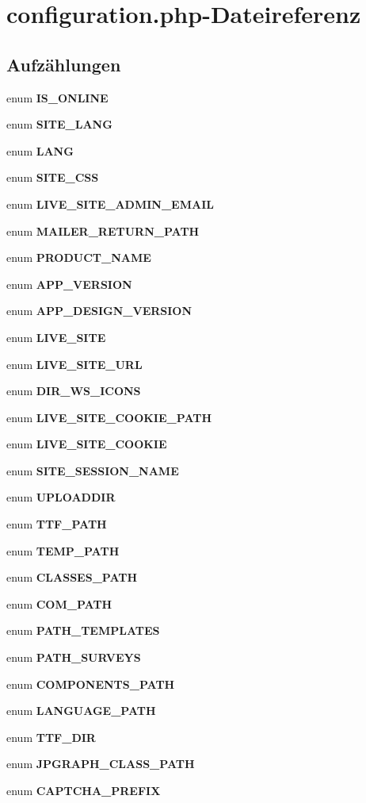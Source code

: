 \section{configuration.php-Dateireferenz}
\label{configuration_8php}
\subsection*{Aufzählungen}
\begin{CompactItemize}
\item 
enum {\bf IS\_\-ONLINE} 
\item 
enum {\bf SITE\_\-LANG} 
\item 
enum {\bf LANG} 
\item 
enum {\bf SITE\_\-CSS} 
\item 
enum {\bf LIVE\_\-SITE\_\-ADMIN\_\-EMAIL} 
\item 
enum {\bf MAILER\_\-RETURN\_\-PATH} 
\item 
enum {\bf PRODUCT\_\-NAME} 
\item 
enum {\bf APP\_\-VERSION} 
\item 
enum {\bf APP\_\-DESIGN\_\-VERSION} 
\item 
enum {\bf LIVE\_\-SITE} 
\item 
enum {\bf LIVE\_\-SITE\_\-URL} 
\item 
enum {\bf DIR\_\-WS\_\-ICONS} 
\item 
enum {\bf LIVE\_\-SITE\_\-COOKIE\_\-PATH} 
\item 
enum {\bf LIVE\_\-SITE\_\-COOKIE} 
\item 
enum {\bf SITE\_\-SESSION\_\-NAME} 
\item 
enum {\bf UPLOADDIR} 
\item 
enum {\bf TTF\_\-PATH} 
\item 
enum {\bf TEMP\_\-PATH} 
\item 
enum {\bf CLASSES\_\-PATH} 
\item 
enum {\bf COM\_\-PATH} 
\item 
enum {\bf PATH\_\-TEMPLATES} 
\item 
enum {\bf PATH\_\-SURVEYS} 
\item 
enum {\bf COMPONENTS\_\-PATH} 
\item 
enum {\bf LANGUAGE\_\-PATH} 
\item 
enum {\bf TTF\_\-DIR} 
\item 
enum {\bf JPGRAPH\_\-CLASS\_\-PATH} 
\item 
enum {\bf CAPTCHA\_\-PREFIX} 
\item 

\end{CompactItemize}
